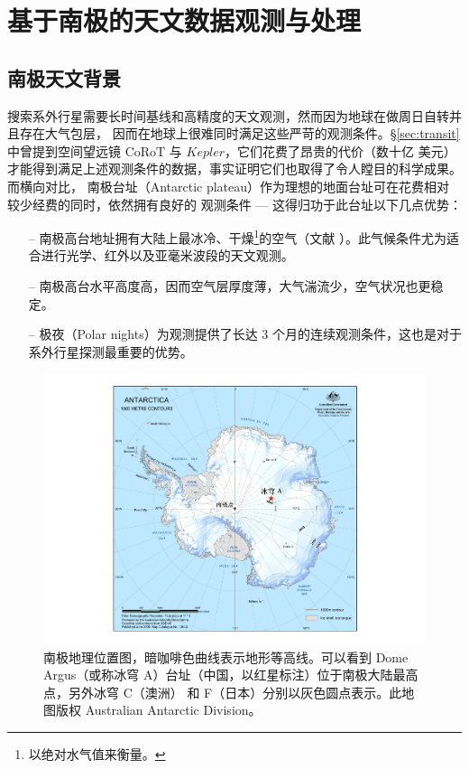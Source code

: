 \chapter{基于南极的天文数据观测与处理} \label{chapter:obs_red}

\section{南极天文背景} \label{sec:antarticabg}

搜索系外行星需要长时间基线和高精度的天文观测，然而因为地球在做周日自转并且存在大气包层，
因而在地球上很难同时满足这些严苛的观测条件。\S \ref{sec:transit} 中曾提到空间望远镜 CoRoT
\cite{Bargeetal2008CoRoT} 与 $Kepler$\cite{Boruckietal2010}，它们花费了昂贵的代价（数十亿
美元）才能得到满足上述观测条件的数据，事实证明它们也取得了令人瞠目的科学成果。而横向对比，
南极台址（Antarctic plateau）作为理想的地面台址可在花费相对较少经费的同时，依然拥有良好的
观测条件 --- 这得归功于此台址以下几点优势：

\begin{enumerate}[leftmargin=1\parindent] 
\item[--] 南极高台地址拥有大陆上最冰冷、干燥\footnote{以绝对水气值来衡量。}的空气（文献 ）。此气候条件尤为适合进行光学、红外以及亚毫米波段的天文观测\cite{Lawrence2004}。
\item[--] 南极高台水平高度高，因而空气层厚度薄，大气湍流少，空气状况也更稳定\cite{Bonner2010}。
\item[--] 极夜（Polar nights）为观测提供了长达 3 个月的连续观测条件，这也是对于系外行星探测最重要的优势\cite{Rauer2008}。
\end{enumerate}

\begin{figure}[t]
\centering
\includegraphics[width=1.0\textwidth]{figures/chapter2/f1_DomeA.pdf}
\caption{南极地理位置图，暗咖啡色曲线表示地形等高线。可以看到 Dome Argus（或称冰穹 A）台址（中国，以红星标注）位于南极大陆最高点，另外冰穹 C（澳洲） 和 F（日本）分别以灰色圆点表示。此地图版权 Australian Antarctic Division。}
\label{fig:domeasite}
\end{figure}

